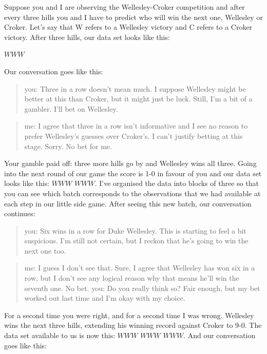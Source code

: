 \documentclass[
  a4paper,
]{book}
\begin{document}
Suppose you and I are observing the Wellesley-Croker competition and
after every three hills you and I have to predict who will win the next
one, Wellesley or Croker. Let's say that W refers to a Wellesley victory
and C refers to a Croker victory. After three hills, our data set looks
like this:

\(WWW\)

Our conversation goes like this:

\begin{quote}
you: Three in a row doesn't mean much. I suppose Wellesley might be
better at this than Croker, but it might just be luck. Still, I'm a bit
of a gambler. I'll bet on Wellesley.
\end{quote}

\begin{quote}
me: I agree that three in a row isn't informative and I see no reason to
prefer Wellesley's guesses over Croker's. I can't justify betting at
this stage. Sorry. No bet for me.
\end{quote}

Your gamble paid off: three more hills go by and Wellesley wins all
three. Going into the next round of our game the score is 1-0 in favour
of you and our data set looks like this: \(WWW\) \(WWW\). I've organised
the data into blocks of three so that you can see which batch
corresponds to the observations that we had available at each step in
our little side game. After seeing this new batch, our conversation
continues:

\begin{quote}
you: Six wins in a row for Duke Wellesley. This is starting to feel a
bit suspicious. I'm still not certain, but I reckon that he's going to
win the next one too.
\end{quote}

\begin{quote}
me: I guess I don't see that. Sure, I agree that Wellesley has won six
in a row, but I don't see any logical reason why that means he'll win
the seventh one. No bet. you: Do you really think so? Fair enough, but
my bet worked out last time and I'm okay with my choice.
\end{quote}

For a second time you were right, and for a second time I was wrong.
Wellesley wins the next three hills, extending his winning record
against Croker to 9-0. The data set available to us is now this: \(WWW\)
\(WWW\) \(WWW\). And our conversation goes like this:
\end{document}

